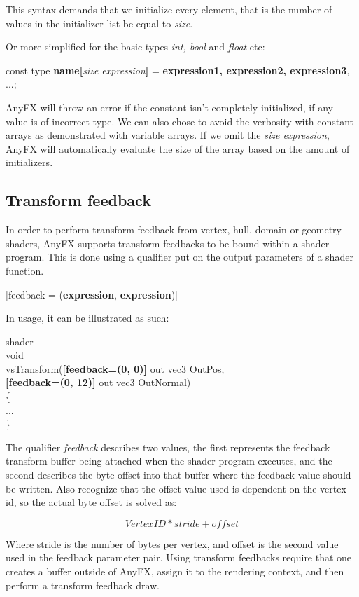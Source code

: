 \documentclass{article}
\newcommand{\SyntaxBox}[1]
{	
	\begin{center}
	\colorbox{orange!60}
	{
		\begin{minipage}{\linewidth}
		\hfill
		\begin{tabbing}
		#1
		\end{tabbing}
		\end{minipage}
	}
	\end{center}
}
\begin{document}
This syntax demands that we initialize every element, that is the number of values in the initializer list be equal to \textit{size}.

Or more simplified for the basic types \textit{int, bool} and \textit{float} etc:

\SyntaxBox
{
	const type \textbf{name[}\textit{size expression}\textbf{]} = \textbf{ expression1, expression2, expression3}, ...;
}


AnyFX will throw an error if the constant isn't completely initialized, if any value is of incorrect type. We can also chose to avoid the verbosity with constant arrays as demonstrated with variable arrays. If we omit the \textit{size expression}, AnyFX will automatically evaluate the size of the array based on the amount of initializers. 

\subsection{Transform feedback}
In order to perform transform feedback from vertex, hull, domain or geometry shaders, AnyFX supports transform feedbacks to be bound within a shader program. This is done using a qualifier put on the output parameters of a shader function.

\SyntaxBox
{
	[feedback = (\textbf{expression}, \textbf{expression})] \\
}

In usage, it can be illustrated as such:

\SyntaxBox
{
	shader \\
	void \\
	vsTransform(\=\textbf{[feedback=(0, 0)]} out vec3 OutPos, \\
		\> \textbf{[feedback=(0, 12)]} out vec3 OutNormal) \\
	\{ \= \\
	\>... \\
	\}
}

The qualifier \textit{feedback} describes two values, the first represents the feedback transform buffer being attached when the shader program executes, and the second describes the byte offset into that buffer where the feedback value should be written. Also recognize that the offset value used is dependent on the vertex id, so the actual byte offset is solved as:

\[
Vertex ID * stride + offset
\]

Where stride is the number of bytes per vertex, and offset is the second value used in the feedback parameter pair. Using transform feedbacks require that one creates a buffer outside of AnyFX, assign it to the rendering context, and then perform a transform feedback draw. 
\end{document}
